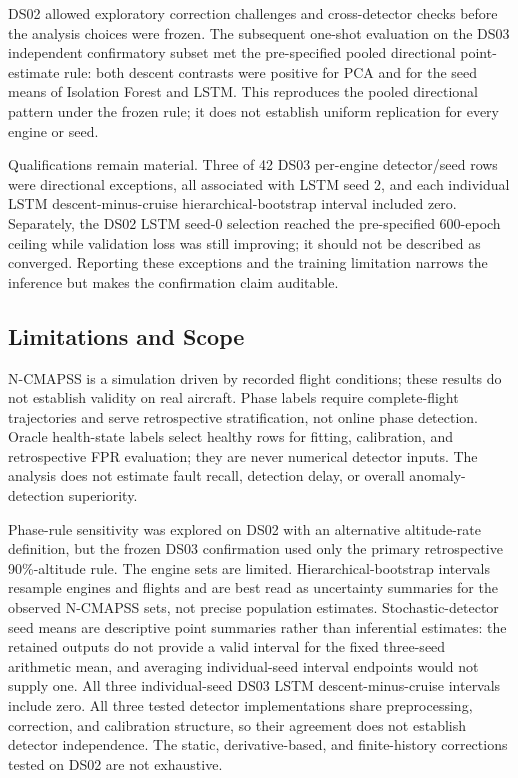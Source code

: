 \documentclass[10pt,twocolumn]{article}
\begin{document}
DS02 allowed exploratory correction challenges and cross-detector checks before the analysis choices were frozen. The subsequent one-shot evaluation on the DS03 independent confirmatory subset met the pre-specified pooled directional point-estimate rule: both descent contrasts were positive for PCA and for the seed means of Isolation Forest and LSTM. This reproduces the pooled directional pattern under the frozen rule; it does not establish uniform replication for every engine or seed.

Qualifications remain material. Three of 42 DS03 per-engine detector/seed rows were directional exceptions, all associated with LSTM seed 2, and each individual LSTM descent-minus-cruise hierarchical-bootstrap interval included zero. Separately, the DS02 LSTM seed-0 selection reached the pre-specified 600-epoch ceiling while validation loss was still improving; it should not be described as converged. Reporting these exceptions and the training limitation narrows the inference but makes the confirmation claim auditable.

\subsection{Limitations and Scope}\label{limitations-and-scope}

N-CMAPSS is a simulation driven by recorded flight conditions; these results do not establish validity on real aircraft. Phase labels require complete-flight trajectories and serve retrospective stratification, not online phase detection. Oracle health-state labels select healthy rows for fitting, calibration, and retrospective FPR evaluation; they are never numerical detector inputs. The analysis does not estimate fault recall, detection delay, or overall anomaly-detection superiority.

Phase-rule sensitivity was explored on DS02 with an alternative altitude-rate definition, but the frozen DS03 confirmation used only the primary retrospective 90\%-altitude rule. The engine sets are limited. Hierarchical-bootstrap intervals resample engines and flights and are best read as uncertainty summaries for the observed N-CMAPSS sets, not precise population estimates. Stochastic-detector seed means are descriptive point summaries rather than inferential estimates: the retained outputs do not provide a valid interval for the fixed three-seed arithmetic mean, and averaging individual-seed interval endpoints would not supply one. All three individual-seed DS03 LSTM descent-minus-cruise intervals include zero. All three tested detector implementations share preprocessing, correction, and calibration structure, so their agreement does not establish detector independence. The static, derivative-based, and finite-history corrections tested on DS02 are not exhaustive.
\end{document}
